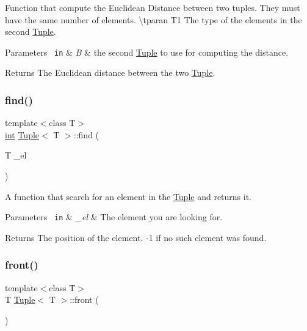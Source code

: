 Function that compute the Euclidean Distance between two tuples. They must have the same number of elements. \textbackslash{}tparan T1 The type of the elements in the second \mbox{\hyperlink{class_tuple}{Tuple}}. 


\begin{DoxyParams}[1]{Parameters}
\mbox{\texttt{ in}}  & {\em B} & the second \mbox{\hyperlink{class_tuple}{Tuple}} to use for computing the distance. \\
\hline
\end{DoxyParams}
\begin{DoxyReturn}{Returns}
The Euclidean distance between the two \mbox{\hyperlink{class_tuple}{Tuple}}. 
\end{DoxyReturn}
\mbox{\label{class_tuple_aab743167e9fd750f71add11b1aa48f6b}} 
\subsubsection{\texorpdfstring{find()}{find()}}
{\footnotesize\ttfamily template$<$class T$>$ \\
\mbox{\hyperlink{draw_8hh_aa620a13339ac3a1177c86edc549fda9b}{int}} \mbox{\hyperlink{class_tuple}{Tuple}}$<$ T $>$\+::find (\begin{DoxyParamCaption}\item[{T}]{\+\_\+el }\end{DoxyParamCaption})\hspace{0.3cm}{\ttfamily [inline]}}



A function that search for an element in the {\ttfamily \mbox{\hyperlink{class_tuple}{Tuple}}} and returns it. 


\begin{DoxyParams}[1]{Parameters}
\mbox{\texttt{ in}}  & {\em \+\_\+el} & The element you are looking for.\\
\hline
\end{DoxyParams}
\begin{DoxyReturn}{Returns}
The position of the element. -\/1 if no such element was found. 
\end{DoxyReturn}
\mbox{\label{class_tuple_a3f97540a70c1e40e3a34c1b5dee9fa0e}} 
\subsubsection{\texorpdfstring{front()}{front()}}
{\footnotesize\ttfamily template$<$class T$>$ \\
T \mbox{\hyperlink{class_tuple}{Tuple}}$<$ T $>$\+::front (\begin{DoxyParamCaption}{ }\end{DoxyParamCaption})\hspace{0.3cm}{\ttfamily [inline]}}

